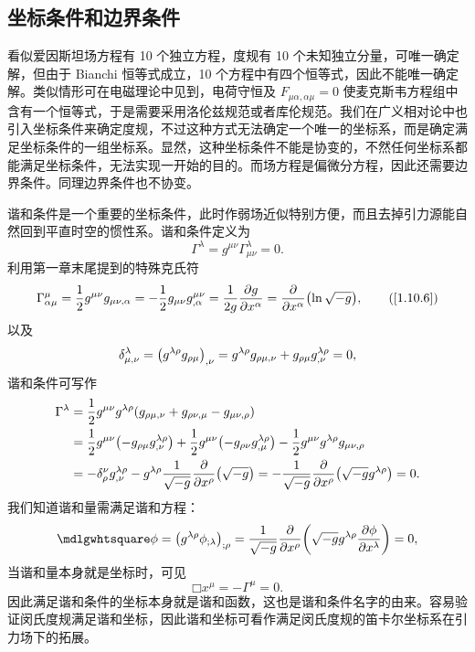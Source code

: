 \documentclass[UTF8, 12pt, a4paper, oneside, onecolumn, fontset=none]{ctexart}
\begin{document}
\subsection{坐标条件和边界条件}
看似爱因斯坦场方程有 10 个独立方程，度规有 10 个未知独立分量，可唯一确定解，但由于 Bianchi 恒等式成立，10 个方程中有四个恒等式，因此不能唯一确定解。类似情形可在电磁理论中见到，电荷守恒及 $F_{\mu\alpha,\alpha\mu}=0$ 使麦克斯韦方程组中含有一个恒等式，于是需要采用洛伦兹规范或者库伦规范。我们在广义相对论中也引入坐标条件来确定度规，不过这种方式无法确定一个唯一的坐标系，而是确定满足坐标条件的一组坐标系。显然，这种坐标条件不能是协变的，不然任何坐标系都能满足坐标条件，无法实现一开始的目的。而场方程是偏微分方程，因此还需要边界条件。同理边界条件也不协变。

谐和条件是一个重要的坐标条件，此时作弱场近似特别方便，而且去掉引力源能自然回到平直时空的惯性系。谐和条件定义为
\begin{equation}
\Gamma^{\lambda}=g^{\mu\nu}\Gamma_{\mu\nu}^{\lambda}=0.
\end{equation}
利用第一章末尾提到的特殊克氏符
\begin{equation}
\Gamma_{\alpha\mu}^{\mu}=\frac{1}{2}g^{\mu\nu}g_{\mu\nu,\alpha}=-\frac{1}{2}g_{\mu\nu}g^{\mu\nu}_{,\alpha}=\frac{1}{2g}\frac{\partial{}g}{\partial{}x^{\alpha}}=\frac{\partial{}}{\partial{}x^{\alpha}}\mleft(\ln\sqrt{-g}\mright),\tag{\ref{1.10.6}}
\end{equation}
以及
\begin{equation}
\delta^{\lambda}_{\mu,\nu}=\mleft(g^{\lambda\rho}g_{\rho\mu}\mright)_{,\nu}=g^{\lambda\rho}g_{\rho\mu,\nu}+g_{\rho\mu}g^{\lambda\rho}_{,\nu}=0,
\end{equation}
谐和条件可写作
\begin{align}
\Gamma^{\lambda}&=\frac{1}{2}g^{\mu\nu}g^{\lambda\rho}\mleft(g_{\rho\mu,\nu}+g_{\rho\nu,\mu}-g_{\mu\nu,\rho}\mright)\notag\\
&=\frac{1}{2}g^{\mu\nu}\mleft(-g_{\rho\mu}g^{\lambda\rho}_{,\nu}\mright)+\frac{1}{2}g^{\mu\nu}\mleft(-g_{\rho\nu}g^{\lambda\rho}_{,\mu}\mright)-\frac{1}{2}g^{\mu\nu}g^{\lambda\rho}g_{\mu\nu,\rho}\notag\\
&=-\delta^{\nu}_{\rho}g^{\lambda\rho}_{,\nu}-g^{\lambda\rho}\frac{1}{\sqrt{-g}}\frac{\partial{}}{\partial{}x^{\rho}}\mleft(\sqrt{-g}\mright)=-\frac{1}{\sqrt{-g}}\frac{\partial{}}{\partial{}x^{\rho}}\mleft(\sqrt{-g}g^{\lambda\rho}\mright)=0.
\end{align}
我们知道谐和量需满足谐和方程：
\begin{equation}
\mdlgwhtsquare\phi=\mleft(g^{\lambda\rho}\phi_{;\lambda}\mright)_{;\rho}=\frac{1}{\sqrt{-g}}\frac{\partial{}}{\partial{}x^{\rho}}\mleft(\sqrt{-g}g^{\lambda\rho}\frac{\partial\phi}{\partial{}x^{\lambda}}\mright)=0,
\end{equation}
当谐和量本身就是坐标时，可见
\begin{equation}
\mdlgwhtsquare{}x^{\mu}=-\Gamma^{\mu}=0.
\end{equation}
因此满足谐和条件的坐标本身就是谐和函数，这也是谐和条件名字的由来。容易验证闵氏度规满足谐和坐标，因此谐和坐标可看作满足闵氏度规的笛卡尔坐标系在引力场下的拓展。
\end{document}
